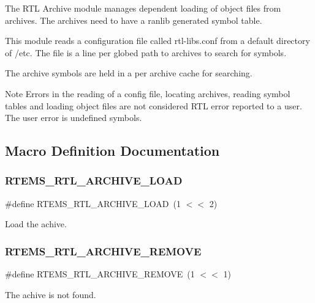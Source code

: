 The R\+TL Archive module manages dependent loading of object files from archives. The archives need to have a {\ttfamily ranlib} generated symbol table.

This module reads a configuration file called {\ttfamily rtl-\/libs.\+conf} from a default directory of {\ttfamily /etc}. The file is a line per glob\textquotesingle{}ed path to archives to search for symbols.

The archive symbols are held in a per archive cache for searching.

\begin{DoxyNote}{Note}
Errors in the reading of a config file, locating archives, reading symbol tables and loading object files are not considered R\+TL error reported to a user. The user error is undefined symbols. 
\end{DoxyNote}


\subsection{Macro Definition Documentation}
\mbox{\label{rtl-archive_8h_a4cc66c432383d2e1bb1593318f027821}} 
\subsubsection{\texorpdfstring{RTEMS\_RTL\_ARCHIVE\_LOAD}{RTEMS\_RTL\_ARCHIVE\_LOAD}}
{\footnotesize\ttfamily \#define R\+T\+E\+M\+S\+\_\+\+R\+T\+L\+\_\+\+A\+R\+C\+H\+I\+V\+E\+\_\+\+L\+O\+AD~(1 $<$$<$ 2)}

Load the achive. \mbox{\label{rtl-archive_8h_a1152d3370fc56cec9d6ee6e9bc8437c6}} 
\subsubsection{\texorpdfstring{RTEMS\_RTL\_ARCHIVE\_REMOVE}{RTEMS\_RTL\_ARCHIVE\_REMOVE}}
{\footnotesize\ttfamily \#define R\+T\+E\+M\+S\+\_\+\+R\+T\+L\+\_\+\+A\+R\+C\+H\+I\+V\+E\+\_\+\+R\+E\+M\+O\+VE~(1 $<$$<$ 1)}

The achive is not found. \mbox{\label{rtl-archive_8h_a3b3e926b4fdf2965140136ef42090656}} 
